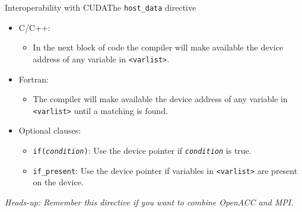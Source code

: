 \documentclass[12pt,aspectratio=169]{beamer}
\begin{document}
\begin{frame}[fragile]{Interoperability with CUDA}{The \texttt{host\_data} directive}
  \begin{itemize}
  \item C/C++: 
    \begin{itemize}
    \item In the next block of code the compiler will make available the device address of any variable in \texttt{<varlist>}.
    \end{itemize}
  \item Fortran: 
    \begin{itemize}
    \item The compiler will make available the device address of any variable in \texttt{<varlist>} until a matching  is found.
    \end{itemize}
  \item Optional clauses:
    \begin{itemize}
    \item \texttt{if(\emph{condition})}: Use the device pointer if \texttt{\emph{condition}} is true.
    \item \texttt{if\_present}: Use the device pointer if variables in \texttt{<varlist>} are present on the device.
    \end{itemize}
  \end{itemize}
  \small\emph{Heads-up: Remember this directive if you want to combine OpenACC and MPI.}
\end{frame}



\end{document}
